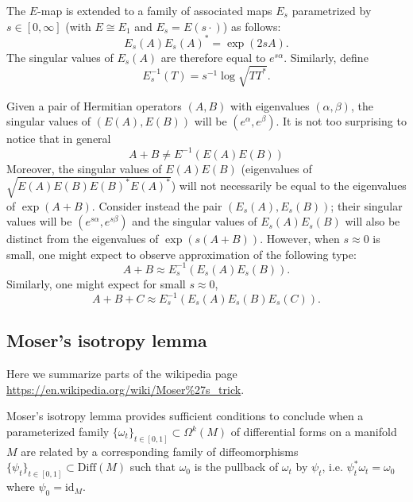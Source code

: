 \documentclass[notitlepage]{article}
\begin{document}
The $E$-map is extended to a family of associated maps $E_s$ parametrized by $s \in [0, \infty]$ (with $E \cong E_1$ and $E_s = E(s \cdot)$) as follows:
\begin{equation}
    E_s(A) E_s(A)^{*} = \exp(2sA).
\end{equation}
The singular values of $E_s(A)$ are therefore equal to $e^{s \alpha}$.
Similarly, define
\begin{equation}
    E_s^{-1}(T) = s^{-1}\log\sqrt{TT^{*}}.
\end{equation}


Given a pair of Hermitian operators $(A,B)$ with eigenvalues $(\alpha, \beta)$, the singular values of $(E(A), E(B))$ will be $(e^{\alpha}, e^{\beta})$.
It is not too surprising to notice that in general
\begin{equation}
    A+B \neq E^{-1}(E(A)E(B))
\end{equation}
Moreover, the singular values of $E(A)E(B)$ (eigenvalues of $\sqrt{E(A)E(B)E(B)^{*}E(A)^{*}}$) will not necessarily be equal to the eigenvalues of $\exp(A+B)$.
Consider instead the pair $(E_s(A), E_s(B))$; their singular values will be $(e^{s\alpha}, e^{s\beta})$ and the singular values of $E_s(A)E_s(B)$ will also be distinct from the eigenvalues of $\exp(s(A+B))$.
However, when $s \approx 0$ is small, one might expect to observe approximation of the following type:
\begin{equation}
    A+B \approx E_s^{-1}(E_s(A)E_s(B)).
\end{equation}
Similarly, one might expect for small $s \approx 0$,
\begin{equation}
    A+B+C \approx E_s^{-1}(E_s(A)E_s(B)E_s(C)).
\end{equation}

\subsection{Moser's isotropy lemma}

Here we summarize parts of the wikipedia page \url{https://en.wikipedia.org/wiki/Moser%27s_trick}.

Moser's isotropy lemma provides sufficient conditions to conclude when a parameterized family $\{\omega_t\}_{t\in[0,1]} \subset \Omega^{k}(M)$ of differential forms on a manifold $M$ are related by a corresponding family of diffeomorphisms $\{\psi_t\}_{t\in[0,1]} \subset \mathrm{Diff}(M)$ such that $\omega_0$ is the pullback of $\omega_t$ by $\psi_t$, i.e. $\psi_t^{*}\omega_t = \omega_0$ where $\psi_0 = \mathrm{id}_M$.
\end{document}
